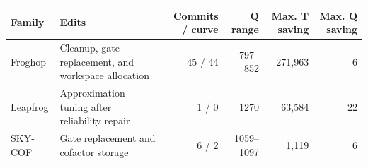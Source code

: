 \begin{tabular}{p{}p{}rrrr}
\toprule
Family & Edits & Commits / curve & Q range & Max. T saving & Max. Q saving \\
\midrule
Froghop & Cleanup, gate replacement, and workspace allocation & 45 / 44 & 797--852 & 271,963 & 6 \\
Leapfrog & Approximation tuning after reliability repair & 1 / 0 & 1270 & 63,584 & 22 \\
SKY-COF & Gate replacement and cofactor storage & 6 / 2 & 1059--1097 & 1,119 & 6 \\
\bottomrule
\end{tabular}
